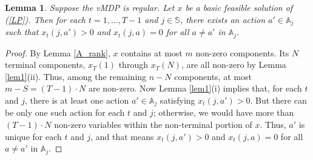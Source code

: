 \documentclass{article}
\newtheorem{lemma}[theorem]{Lemma}
\theoremstyle{definition}
\numberwithin{equation}{section}
\begin{document}

\begin{lemma}
\label{bfs_unique_action}
Suppose the vMDP is regular. Let $x$ be a basic feasible solution of {\rm (\ref{LP})}. Then for each $t = 1, ..., T-1$ and $j \in \mathbb{S}$, there exists an action $a' \in \mathbb{A}_j$ such that $x_t(j, a') > 0$ and $x_{t}(j, a) = 0$ for all $a \neq a'$ in $\mathbb{A}_j$.
\end{lemma}

\begin{proof}
By Lemma \ref{A_rank}, $x$ contains at most $m$ non-zero components. Its $N$ terminal components, $x_T(1)$ through $x_T(N)$, are all non-zero by Lemma \ref{lem1}(ii). Thus, among the remaining $n - N$ components, at most $m - S= (T-1)\cdot N$ are non-zero. Now Lemma \ref{lem1}(i) implies that, for each $t$ and $j$, there is at least one action $a' \in \mathbb{A}_j$ satisfying $x_{t}(j, a') > 0$. 
But there can be only one such action for each $t$ and $j$; otherwise, we would have more than $(T-1)\cdot N$ non-zero variables within the non-terminal portion of $x$. Thus, $a'$ is unique for each $t$ and $j$, and that means $x_t(j,a') > 0$ and $x_t(j, a) = 0$ for all $a \neq a'$ in $\mathbb{A}_j$.
\end{proof}

\end{document}
